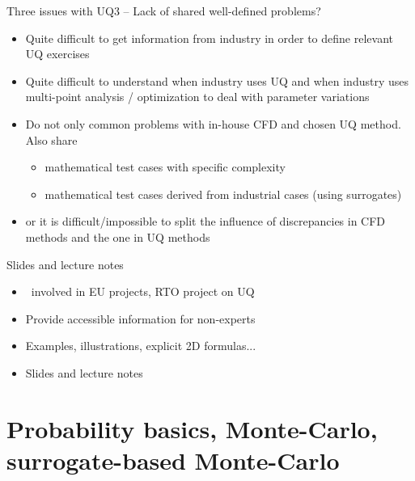 \documentclass[10pt]{beamer}
\def\vr{\vspace{3mm}}
\def\vf{\vspace{4mm}}
\def\begit{\begin{itemize}}
\def\endit{\end{itemize}}
\begin{document}
%
%
\begin{frame}{Three issues with UQ}{3 -- Lack of shared well-defined problems?}
%
\begit
  \item Quite difficult to get information from industry in order to define relevant UQ exercises
  \vr 
  \item Quite difficult to understand when industry uses UQ and when industry uses multi-point analysis / optimization to deal with
   parameter variations 
  \vr 
  \item Do not only common problems with in-house CFD and chosen UQ method. Also share
    \begit  
    \item mathematical test cases with specific complexity
    \item mathematical test cases derived from  industrial cases (using surrogates)
    \endit 
  \item[] or it is difficult/impossible to split the influence of discrepancies in CFD methods and the one in UQ methods
\endit
%
\end{frame} 
%
%
\begin{frame}{Slides and lecture notes}
%
\begit
  \item \Onera\ involved in EU projects, RTO project on UQ 
  \vf 
  \item Provide accessible information for non-experts
  \item Examples, illustrations, explicit 2D formulas...
  \vf 
  \item Slides and lecture notes
\endit
%
\end{frame} 
%
%

\section{Probability basics, Monte-Carlo, surrogate-based Monte-Carlo}
\end{document}
